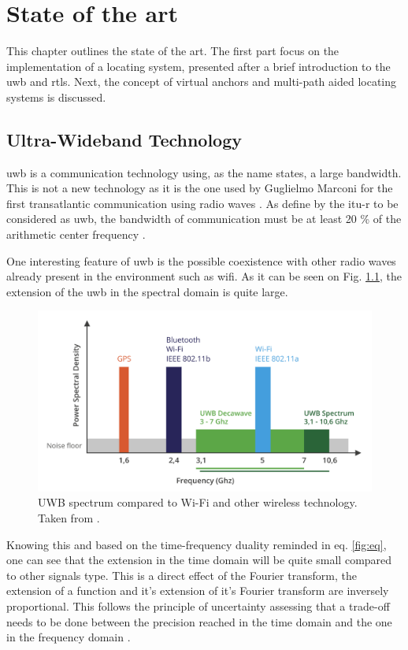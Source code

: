 % 			 
%
%

\chapter{State of the art}
\label{stateoftheart}

This chapter outlines the state of the art. The first part focus on the implementation of a locating system, presented after a brief introduction to the \gls{uwb} and \gls{rtls}. Next, the concept of virtual anchors and multi-path aided locating systems is discussed.


\section{Ultra-Wideband Technology}
\label{uwb}
\gls{uwb} is a communication technology using, as the name states, a large bandwidth. This is not a new technology as it is the one used by Guglielmo Marconi for the first transatlantic communication using radio waves \cite{nekoogar2005uwb}. As define by the \gls{itu-r} to be considered as \gls{uwb}, the bandwidth of communication must be at least 20 \% of the arithmetic center frequency \cite{itur2006characteristics}.
\vspace{2mm}

One interesting feature of \gls{uwb} is the possible coexistence with other radio waves already present in the environment such as \gls{wifi}. As it can be seen on Fig. \ref{fig:UWB_Techonology}, the extension of the \gls{uwb} in the spectral domain is quite large. 

\begin{figure}[H]
\includegraphics[width=.6\linewidth]{Images/uwb_bandwidth.png}
\centering
\caption{UWB spectrum compared to Wi-Fi and other wireless technology. Taken from \cite{itur2006characteristics}.}
\label{fig:UWB_Techonology}
\end{figure} 

Knowing this and based on the time-frequency duality reminded in eq. \ref{fig:eq}, one can see that the extension in the time domain will be quite small compared to other signals type. This is a direct effect of the Fourier transform, the extension of a function and it's extension of it's Fourier transform are inversely proportional. This follows the principle of uncertainty assessing that a trade-off needs to be done between the precision reached in the time domain and the one in the frequency domain \cite{donoho1989uncertainty}.

